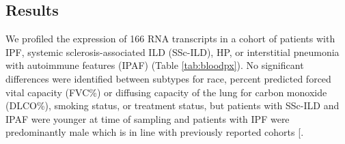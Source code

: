 \documentclass[
]{article}
\begin{document}
\subsection{Results}\label{results-1}

We profiled the expression of 166 RNA transcripts in a cohort of patients with IPF, systemic sclerosis-associated ILD (SSc-ILD), HP, or interstitial pneumonia with autoimmune features (IPAF) (Table \ref{tab:bloodpx}). No significant differences were identified between subtypes for race, percent predicted forced vital capacity (FVC\%) or diffusing capacity of the lung for carbon monoxide (DLCO\%), smoking status, or treatment status, but patients with SSc-ILD and IPAF were younger at time of sampling and patients with IPF were predominantly male which is in line with previously reported cohorts {[}\citeproc{ref-zaman_differences_2020}{105}{]}.

\captionsetup{width=6.5in}
\end{document}
